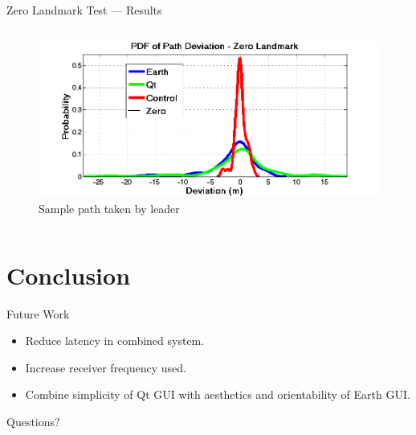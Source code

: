 \documentclass{beamer}
\begin{document}
\begin{frame}{Zero Landmark Test --- Results}
\begin{columns}
\begin{column}{0.5\textwidth}
\begin{figure}
          \end{figure}
          \vspace{-20pt}
          \begin{figure}
            \includegraphics[width=\textwidth]{../graphics/pdf_zero_landmark_deviation.png}
            \caption{\footnotesize Sample path taken by leader}
          \end{figure}
        \end{column}
      \end{columns}
    \end{frame}



\section{Conclusion}

  \begin{frame}{Future Work}
    \begin{itemize}
      \item Reduce latency in combined system.
      \item Increase receiver frequency used.
      \item Combine simplicity of Qt GUI with aesthetics and orientability of Earth GUI.
    \end{itemize}
  \end{frame}

  \begin{frame}{}
    \centering \Huge Questions?
  \end{frame}
\end{document}
